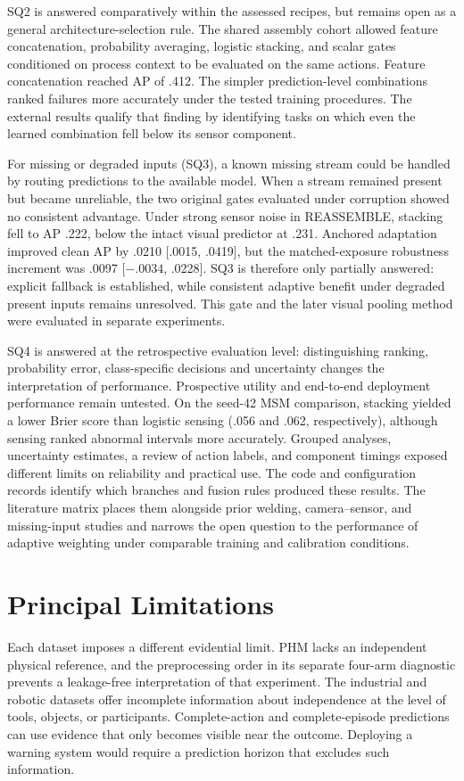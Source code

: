 SQ2 is answered comparatively within the assessed recipes, but remains open as a general
architecture-selection rule. The shared assembly cohort allowed feature concatenation,
probability averaging, logistic stacking, and scalar gates conditioned on process
context to be evaluated on the same actions. Feature concatenation reached AP of .412.
The simpler prediction-level combinations ranked failures more accurately under the
tested training procedures. The external results qualify that finding by identifying
tasks on which even the learned combination fell below its sensor component.

For missing or degraded inputs (SQ3), a known missing stream could be handled by routing
predictions to the available model. When a stream remained present but became
unreliable, the two original gates evaluated under corruption showed no consistent
advantage. Under strong sensor noise in REASSEMBLE, stacking fell to AP .222, below the
intact visual predictor at .231. Anchored adaptation improved clean AP by .0210 [.0015,
.0419], but the matched-exposure robustness increment was .0097 [$-.0034$, .0228]. SQ3
is therefore only partially answered: explicit fallback is established, while consistent
adaptive benefit under degraded present inputs remains unresolved. This gate and the
later visual pooling method were evaluated in separate experiments.

SQ4 is answered at the retrospective evaluation level: distinguishing ranking,
probability error, class-specific decisions and uncertainty changes the interpretation
of performance. Prospective utility and end-to-end deployment performance remain
untested. On the seed-42 MSM comparison, stacking yielded a lower Brier score than
logistic sensing (.056 and .062, respectively), although sensing ranked abnormal
intervals more accurately. Grouped analyses, uncertainty estimates, a review of action
labels, and component timings exposed different limits on reliability and practical use.
The code and configuration records identify which branches and fusion rules produced
these results. The literature matrix places them alongside prior welding,
camera--sensor, and missing-input studies and narrows the open question to the
performance of adaptive weighting under comparable training and calibration conditions.

\section{Principal Limitations}
Each dataset imposes a different evidential limit. PHM lacks an independent physical
reference, and the preprocessing order in its separate four-arm diagnostic prevents a
leakage-free interpretation of that experiment. The industrial and robotic datasets
offer incomplete information about independence at the level of tools, objects, or
participants. Complete-action and complete-episode predictions can use evidence that
only becomes visible near the outcome. Deploying a warning system would require a
prediction horizon that excludes such information.

